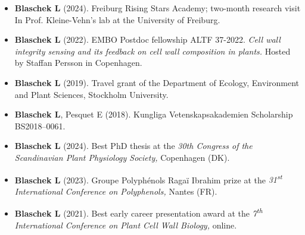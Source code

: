 \documentclass[11pt]{article}
\begin{document}
\vspace{-0.175cm}
\begin{itemize}[label={},itemindent=-9pt,leftmargin=24pt]
	\itemsep-0.1cm
	\item \textbf{Blaschek L} (2024).  Freiburg Rising Stars Academy; two-month research visit In Prof. Kleine-Vehn's lab at the University of Freiburg. 
	\item \textbf{Blaschek L} (2022). EMBO Postdoc fellowship ALTF 37-2022. \textit{Cell wall integrity sensing and its feedback on cell wall composition in plants.} Hosted by Staffan Persson in Copenhagen.
	\item \textbf{Blaschek L} (2019). Travel grant of the Department of Ecology, Environment and Plant Sciences, Stockholm University.
	\item \textbf{Blaschek L}, Pesquet E (2018). Kungliga Vetenskapsakademien Scholarship BS2018--0061.
\end{itemize}
\vspace{0.3cm}

\vspace{-0.175cm}
\begin{itemize}[label={},itemindent=-9pt,leftmargin=24pt]
	\itemsep-0.1cm
	\item \textbf{Blaschek L} (2024). Best PhD thesis at the \textit{30th Congress of the Scandinavian Plant Physiology Society,} Copenhagen (DK). 
	\item \textbf{Blaschek L} (2023). Groupe Polyphénols Ragaï Ibrahim prize at the \textit{31\textsuperscript{st} International Conference on Polyphenols,} Nantes (FR).
	\item \textbf{Blaschek L} (2021). Best early career presentation award at the \textit{7\textsuperscript{th} International Conference on Plant Cell Wall Biology,} online.
\end{itemize}
\vspace{0.3cm}

\newpage


\vspace{0.3cm}
\end{document}
